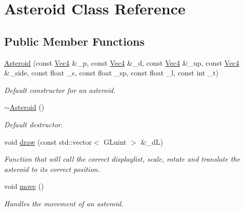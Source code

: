 \hypertarget{classAsteroid}{
\section{Asteroid Class Reference}
\label{classAsteroid}
}
\subsection*{Public Member Functions}
\begin{DoxyCompactItemize}
\item 
\hyperlink{classAsteroid_a73e0331aafe2bdd1683446cfa20895de}{Asteroid} (const \hyperlink{classVec4}{Vec4} \&\_\-p, const \hyperlink{classVec4}{Vec4} \&\_\-d, const \hyperlink{classVec4}{Vec4} \&\_\-up, const \hyperlink{classVec4}{Vec4} \&\_\-side, const float \_\-s, const float \_\-sp, const float \_\-l, const int \_\-t)
\begin{DoxyCompactList}\small\item\em Default constructor for an asteroid. \item\end{DoxyCompactList}\item 
\hypertarget{classAsteroid_af2d697c3722cfb1c79997b6cf63c89df}{
\hyperlink{classAsteroid_af2d697c3722cfb1c79997b6cf63c89df}{$\sim$Asteroid} ()}
\label{classAsteroid_af2d697c3722cfb1c79997b6cf63c89df}

\begin{DoxyCompactList}\small\item\em Default destructor. \item\end{DoxyCompactList}\item 
void \hyperlink{classAsteroid_a1eab739445111f8736a2e7610645a7b2}{draw} (const std::vector$<$ GLuint $>$ \&\_\-dL)
\begin{DoxyCompactList}\small\item\em Function that will call the correct displaylist, scale, rotate and translate the asteroid to its correct position. \item\end{DoxyCompactList}\item 
\hypertarget{classAsteroid_ae343af197b72522a9979838f474e4371}{
void \hyperlink{classAsteroid_ae343af197b72522a9979838f474e4371}{move} ()}
\label{classAsteroid_ae343af197b72522a9979838f474e4371}

\begin{DoxyCompactList}\small\item\em Handles the movement of an asteroid. \item\end{DoxyCompactList}\end{DoxyCompactItemize}
